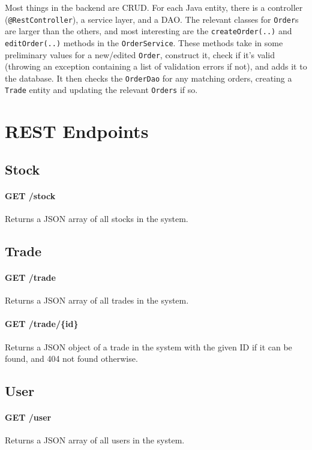 \documentclass{article}
\begin{document}
Most things in the backend are CRUD. For each Java entity, there is a controller (\texttt{@RestController}), a service layer, and a DAO. The relevant classes for \texttt{Order}s are larger than the others, and most interesting are the \texttt{createOrder(..)} and \texttt{editOrder(..)} methods in the \texttt{OrderService}. These methods take in some preliminary values for a new/edited \texttt{Order}, construct it, check if it's valid (throwing an exception containing a list of validation errors if not), and adds it to the database. It then checks the \texttt{OrderDao} for any matching orders, creating a \texttt{Trade} entity and updating the relevant \texttt{Orders} if so.

\section{REST Endpoints}

\subsection{Stock}

\paragraph{GET /stock} Returns a JSON array of all stocks in the system.

\subsection{Trade}

\paragraph{GET /trade} Returns a JSON array of all trades in the system.

\paragraph{GET /trade/\{id\}} Returns a JSON object of a trade in the system with the given ID if it can be found, and 404 not found otherwise.

\subsection{User}

\paragraph{GET /user} Returns a JSON array of all users in the system.
\end{document}
